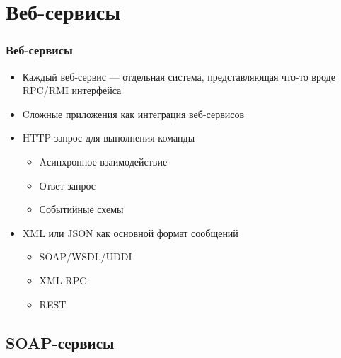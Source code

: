 \documentclass{../../slides-style}
\begin{document}
    \section{Веб-сервисы}

    \begin{frame}
        \frametitle{Веб-сервисы}
        \begin{itemize}
            \item Каждый веб-сервис --- отдельная система, представляющая что-то вроде RPC/RMI интерфейса
            \item Cложные приложения как интеграция веб-сервисов
            \item HTTP-запрос для выполнения команды
            \begin{itemize}
                \item Aсинхронное взаимодействие
                \item Ответ-запрос
                \item Событийные схемы
            \end{itemize}
            \item XML или JSON как основной формат сообщений
            \begin{itemize}
                \item SOAP/WSDL/UDDI
                \item XML-RPC
                \item REST
            \end{itemize}
        \end{itemize}
    \end{frame}

    \subsection{SOAP-сервисы}
\end{document}
